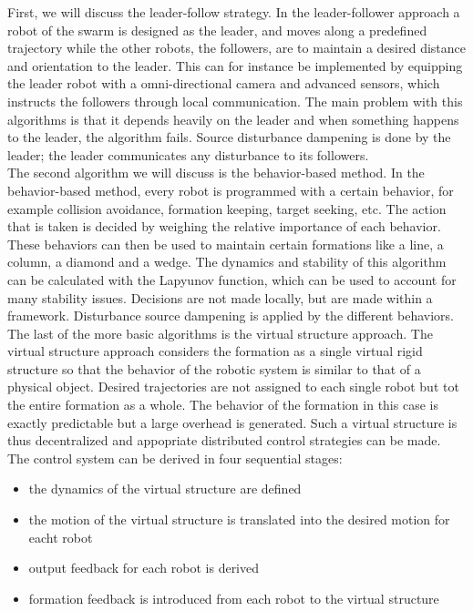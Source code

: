 First, we will discuss the leader-follow strategy. 
In the leader-follower approach a robot of the swarm is designed as the leader, 
and moves along a predefined trajectory while the other robots, the followers, are to maintain a desired distance and orientation to the leader. \cite{Consolini}
This can for instance be implemented by equipping the leader robot with a omni-directional camera and advanced sensors, which instructs the followers through local communication. \cite{Das}
The main problem with this algorithms is that it depends heavily on the leader and when something happens to the leader, the algorithm fails. 
Source disturbance dampening is done by the leader; the leader communicates any disturbance to its followers. \\

The second algorithm we will discuss is the behavior-based method. 
In the behavior-based method, every robot is programmed with a certain behavior, for example collision avoidance, formation keeping, target seeking, etc. 
The action that is taken is decided by weighing the relative importance of each behavior. \cite{consolini}
These behaviors can then be used to maintain certain formations like a line, a column, a diamond and a wedge. \cite{Balch}
The dynamics and stability of this algorithm can be calculated with the Lapyunov function, which can be used to account for many stability issues. \cite{Lawton}
Decisions are not made locally, but are made within a framework.
Disturbance source dampening is applied by the different behaviors. \\

The last of the more basic algorithms is the virtual structure approach. 
The virtual structure approach considers the formation as a single virtual rigid structure so that the behavior of the robotic system is similar to that of a physical object. 
Desired trajectories are not assigned to each single robot but tot the entire formation as a whole. 
The behavior of the formation in this case is exactly predictable but a large overhead is generated. \cite{consolini}
Such a virtual structure is thus decentralized and appopriate distributed control strategies can be made. \cite{Ren}
The control system can be derived in four sequential stages: \cite{Do}
\begin{itemize}
	\item the dynamics of the virtual structure are defined
	\item the motion of the virtual structure is translated into the desired motion for eacht robot
	\item output feedback for each robot is derived
	\item formation feedback is introduced from each robot to the virtual structure
\end{itemize} 

